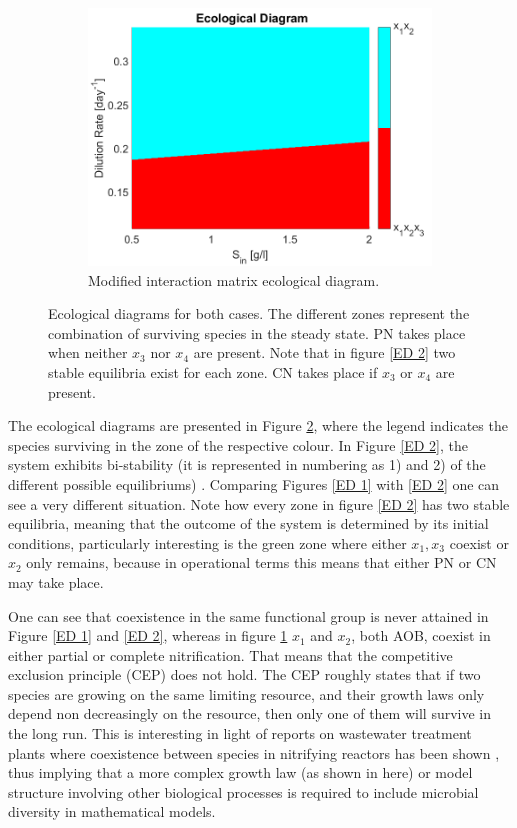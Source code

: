 \documentclass[3p,times]{article}
\begin{document}
\begin{figure}[h]
\begin{subfigure}[t]{0.32\textwidth}
	\includegraphics[width=\textwidth]{Stability/ED_parameters_modified_2}
	\caption{Modified interaction matrix ecological diagram.}
	\label{ED 3}
\end{subfigure}

	\caption{Ecological diagrams for both cases. The different zones represent the combination of surviving species in the steady state. PN takes place when neither $x_3$ nor $x_4$ are present. Note that in figure \ref{ED 2} two stable equilibria exist for each zone. CN takes place if $x_3$ or $x_4$ are present. }
	\label{ecological_diagrams}
\end{figure}

The ecological diagrams are presented in Figure \ref{ecological_diagrams}, where the legend indicates the species surviving in the zone of the respective colour. In Figure \ref{ED 2}, the system exhibits bi-stability (it is represented in numbering as 1) and 2) of the different possible equilibriums) . Comparing Figures \ref{ED 1} with \ref{ED 2} one can see a very different situation. Note how every zone in figure \ref{ED 2} has two stable equilibria, meaning that the outcome of the system is determined by its initial conditions, particularly interesting is the green zone where either $x_1,x_3$ coexist or $x_2$ only remains, because in operational terms this means that either PN or CN may take place.

One can see that coexistence in the same functional group is never attained in Figure \ref{ED 1} and \ref{ED 2}, whereas in figure \ref{ED 3} $x_1$ and $x_2$, both AOB, coexist in either partial or complete nitrification. That means that the competitive exclusion principle \cite{lobry2017chemostat} (CEP) does not hold. The CEP roughly states that if two species are growing on the same limiting resource, and their growth laws only depend non decreasingly on the resource, then only one of them will survive in the long run. This is interesting in light of reports on wastewater treatment plants where coexistence between species in nitrifying reactors has been shown \cite{Wagner2002}, thus implying that a more complex growth law (as shown in here) or model structure involving other biological processes is required to include microbial diversity in mathematical models. 
\end{document}
